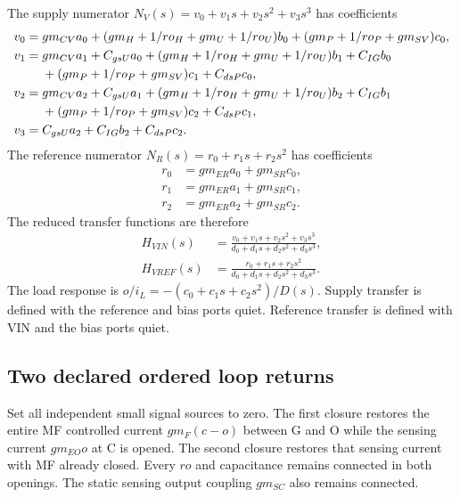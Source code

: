 \documentclass[11pt]{article}
\begin{document}
The supply numerator $N_V(s)=v_0+v_1s+v_2s^2+v_3s^3$ has coefficients
\begin{align}
v_0={}&gm_{CV}a_0+(gm_H+1/ro_H+gm_U+1/ro_U)b_0
+(gm_P+1/ro_P+gm_{SV})c_0,\\
v_1={}&gm_{CV}a_1+C_{gsU}a_0
+(gm_H+1/ro_H+gm_U+1/ro_U)b_1+C_{IG}b_0\notag\\
&+(gm_P+1/ro_P+gm_{SV})c_1+C_{dsP}c_0,\\
v_2={}&gm_{CV}a_2+C_{gsU}a_1
+(gm_H+1/ro_H+gm_U+1/ro_U)b_2+C_{IG}b_1\notag\\
&+(gm_P+1/ro_P+gm_{SV})c_2+C_{dsP}c_1,\\
v_3={}&C_{gsU}a_2+C_{IG}b_2+C_{dsP}c_2.
\end{align}
The reference numerator $N_R(s)=r_0+r_1s+r_2s^2$ has coefficients
\begin{align}
r_0&=gm_{ER}a_0+gm_{SR}c_0,\\
r_1&=gm_{ER}a_1+gm_{SR}c_1,\\
r_2&=gm_{ER}a_2+gm_{SR}c_2.
\end{align}
The reduced transfer functions are therefore
\begin{align}
H_{VIN}(s)&=\frac{v_0+v_1s+v_2s^2+v_3s^3}{d_0+d_1s+d_2s^2+d_3s^3},\\
H_{VREF}(s)&=\frac{r_0+r_1s+r_2s^2}{d_0+d_1s+d_2s^2+d_3s^3}.
\end{align}
The load response is $o/i_L=-(c_0+c_1s+c_2s^2)/D(s)$. Supply transfer is defined with the reference and bias ports quiet. Reference transfer is defined with VIN and the bias ports quiet.

\subsection*{Two declared ordered loop returns}
Set all independent small signal sources to zero. The first closure restores the entire MF controlled current $gm_F(c-o)$ between G and O while the sensing current $gm_{EO}o$ at C is opened. The second closure restores that sensing current with MF already closed. Every $ro$ and capacitance remains connected in both openings. The static sensing output coupling $gm_{SC}$ also remains connected.
\end{document}
